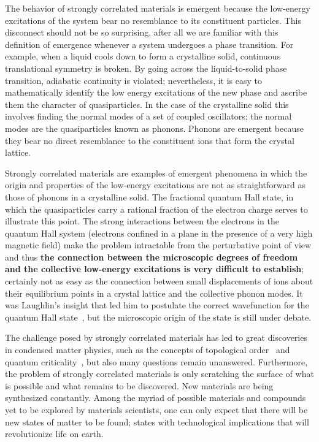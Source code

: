The behavior of strongly correlated materials is emergent because the
low-energy excitations of the system bear no resemblance to its constituent
particles.  This disconnect should not be so surprising, after all we are
familiar with this definition of emergence whenever a system undergoes a phase
transition.  For example, when a liquid cools down to form a crystalline solid,
continuous translational symmetry is broken.    By going across the
liquid-to-solid phase transition, adiabatic continuity is violated;
nevertheless, it is easy to mathematically identify the low energy excitations
of the new phase and ascribe them the character of quasiparticles.  In the case
of the crystalline solid this involves finding the normal modes of a set of
coupled oscillators; the normal modes are the quasiparticles known as phonons.
Phonons are emergent because they bear no direct resemblance to the constituent
ions that form the crystal lattice. 

Strongly correlated materials are examples of emergent phenomena in which the
origin and properties of the low-energy excitations are not as straightforward
as those of phonons in a crystalline solid.  The fractional quantum Hall state,
in which the quasiparticles carry a rational fraction of the electron charge
serves to illustrate this point.  The strong interactions between the electrons
in the quantum Hall system (electrons confined in a plane in the presence of a
very high magnetic field) make the problem intractable from the perturbative
point of view and thus \textbf{the connection between the microscopic degrees
of freedom and the collective low-energy excitations is very difficult to
establish}; certainly not as easy as the connection between small displacements
of ions about their equilibrium points in a crystal lattice and the collective
phonon modes. It was Laughlin's insight that led him to postulate the correct
wavefunction  for the quantum Hall state~\cite{PhysRevLett.50.1395}, but the
microscopic origin of the state is still under debate.   

The challenge posed by strongly correlated materials has led to great
discoveries in condensed matter physics, such as the concepts of topological
order~\cite{wen1990topological} and quantum
criticality~\cite{PhysRevB.14.1165,sachdev2011quantum}, but also many questions
remain unanswered.  Furthermore, the problem of strongly correlated materials
is only scratching the surface of what is possible and what remains to be
discovered.  New materials are being synthesized constantly.  Among the
myriad of possible materials and compounds yet to be explored by
materials scientists, one can only expect that there will be new states of
matter to be found; states with technological implications that will
revolutionize life on earth.  


